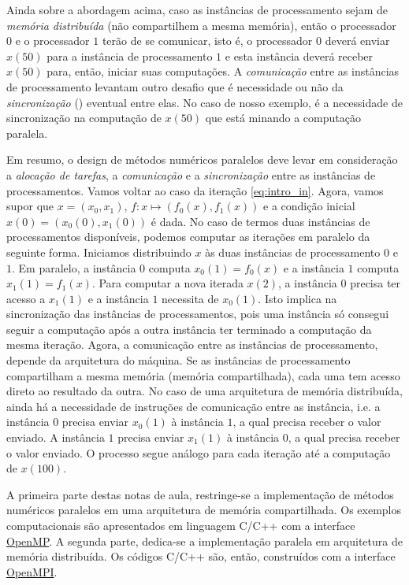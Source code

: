 Ainda sobre a abordagem acima, caso as instâncias de processamento sejam de \emph{memória distribuída} (não compartilhem a mesma memória), então o processador $0$ e o processador $1$ terão de se comunicar, isto é, o processador $0$ deverá enviar $x(50)$ para a instância de processamento $1$ e esta instância deverá receber $x(50)$ para, então, iniciar suas computações. A \emph{comunicação} entre as instâncias de processamento levantam outro desafio que é necessidade ou não da \emph{sincronização} () eventual entre elas. No caso de nosso exemplo, é a necessidade de sincronização na computação de $x(50)$ que está minando a computação paralela.

Em resumo, o design de métodos numéricos paralelos deve levar em consideração a \emph{alocação de tarefas}, a \emph{comunicação} e a \emph{sincronização} entre as instâncias de processamentos. Vamos voltar ao caso da iteração \eqref{eq:intro_in}. Agora, vamos supor que $x = (x_0, x_1)$, $f:x\mapsto (f_0(x), f_1(x))$ e a condição inicial $x(0)=(x_{0}(0), x_{1}(0))$ é dada. No caso de termos duas instâncias de processamentos disponíveis, podemos computar as iterações em paralelo da seguinte forma. Iniciamos distribuindo $x$ às duas instâncias de processamento $0$ e $1$. Em paralelo, a instância $0$ computa $x_{0}(1) = f_0(x)$ e a instância $1$ computa $x_{1}(1) = f_1(x)$. Para computar a nova iterada $x(2)$, a instância $0$ precisa ter acesso a $x_{1}(1)$ e a instância $1$ necessita de $x_{0}(1)$. Isto implica na sincronização das instâncias de processamentos, pois uma instância só consegui seguir a computação após a outra instância ter terminado a computação da mesma iteração. Agora, a comunicação entre as instâncias de processamento, depende da arquitetura do máquina. Se as instâncias de processamento compartilham a mesma memória (memória compartilhada), cada uma tem acesso direto ao resultado da outra. No caso de uma arquitetura de memória distribuída, ainda há a necessidade de instruções de comunicação entre as instância, i.e. a instância $0$ precisa enviar $x_{0}(1)$ à instância $1$, a qual precisa receber o valor enviado. A instância $1$ precisa enviar $x_{1}(1)$ à instância $0$, a qual precisa receber o valor enviado. O processo segue análogo para cada iteração até a computação de $x(100)$.

A primeira parte destas notas de aula, restringe-se a implementação de métodos numéricos paralelos em uma arquitetura de memória compartilhada. Os exemplos computacionais são apresentados em linguagem C/C++ com a interface \href{https://www.openmp.org/}{OpenMP}. A segunda parte, dedica-se a implementação paralela em arquitetura de memória distribuída. Os códigos C/C++ são, então, construídos com a interface \href{https://www.open-mpi.org/}{OpenMPI}.
